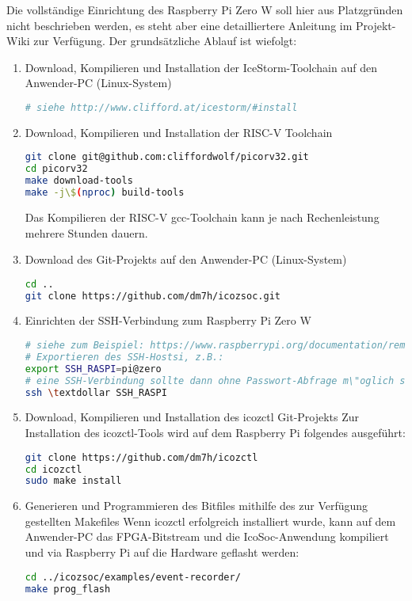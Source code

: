Die vollständige Einrichtung des Raspberry Pi Zero W soll hier aus Platzgründen nicht beschrieben werden, es steht aber eine detailliertere Anleitung im Projekt-Wiki zur Verfügung.
Der grundsätzliche Ablauf ist wiefolgt:
\begin{enumerate}

\item Download, Kompilieren und Installation der IceStorm-Toolchain auf den Anwender-PC (Linux-System)

\begin{lstlisting}[language=bash]
# siehe http://www.clifford.at/icestorm/#install
\end{lstlisting}

\item Download, Kompilieren und Installation der RISC-V Toolchain

\begin{lstlisting}[language=bash]
git clone git@github.com:cliffordwolf/picorv32.git
cd picorv32
make download-tools
make -j\$(nproc) build-tools
\end{lstlisting}

Das Kompilieren der RISC-V gcc-Toolchain kann je nach Rechenleistung mehrere Stunden dauern.

\item Download des Git-Projekts auf den Anwender-PC (Linux-System)

\begin{lstlisting}[language=bash]
cd ..
git clone https://github.com/dm7h/icozsoc.git
\end{lstlisting}


\item Einrichten der SSH-Verbindung zum Raspberry Pi Zero W 

\begin{lstlisting}[language=bash]
# siehe zum Beispiel: https://www.raspberrypi.org/documentation/remote-access/ssh/passwordless.md
# Exportieren des SSH-Hostsi, z.B.:
export SSH_RASPI=pi@zero
# eine SSH-Verbindung sollte dann ohne Passwort-Abfrage m\"oglich sein:
ssh \textdollar SSH_RASPI
\end{lstlisting}

\item Download, Kompilieren und Installation des icozctl Git-Projekts 
Zur Installation des icozctl-Tools wird auf dem Raspberry Pi folgendes ausgeführt:
\begin{lstlisting}[language=bash]
git clone https://github.com/dm7h/icozctl
cd icozctl
sudo make install
\end{lstlisting}

\item Generieren und Programmieren des Bitfiles mithilfe des zur Verfügung gestellten Makefiles
Wenn icozctl erfolgreich installiert wurde, kann auf dem Anwender-PC das FPGA-Bitstream und die 
IcoSoc-Anwendung kompiliert und via Raspberry Pi auf die Hardware geflasht werden:
\begin{lstlisting}[language=bash]
cd ../icozsoc/examples/event-recorder/
make prog_flash
\end{lstlisting}

 
\end{enumerate}

